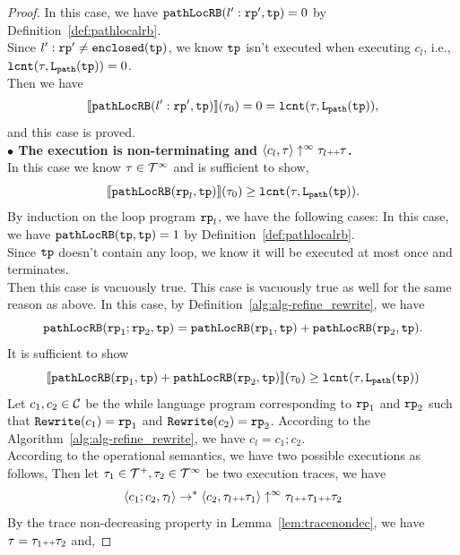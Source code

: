 \begin{proof}
  In this case, we have $\mathtt{pathLocRB}(l': \mathtt{rp}', \mathtt{tp}) = { 0} $ by Definition~\ref{def:pathlocalrb}.
  \\
  Since $l': \mathtt{rp}' \neq \mathtt{enclosed}(\mathtt{tp})$, we know $\mathtt{tp}$ isn't executed when executing $c_l$, i.e., $\mathtt{lcnt}(\mathtt{\tau}, \mathtt{L}_{\mathtt{path}}(\mathtt{tp})) = 0$.
  \\
  Then we have
  \[
    \llbracket \mathtt{pathLocRB}(l': \mathtt{rp}', \mathtt{tp}) \rrbracket(\mathtt{\tau}_0) = 0 = \mathtt{lcnt}(\mathtt{\tau}, \mathtt{L}_{\mathtt{path}}(\mathtt{tp})),
    \]
  and this case is proved.
\\
\textbf{$\bullet$ The execution is non-terminating and {$\langle {c_l}, \mathtt{\tau} \rangle \uparrow^{\infty} \mathtt{\tau}_l {\scriptscriptstyle ++} \mathtt{\tau}$}.} 
\\
 In this case we know $\mathtt{\tau} \in \mathcal{T}^{\infty}$ and is sufficient to show,
\[
  \llbracket \mathtt{pathLocRB}(\mathtt{rp}_l, \mathtt{tp}) \rrbracket(\mathtt{\tau}_0) \geq \mathtt{lcnt}(\mathtt{\tau}, \mathtt{L}_{\mathtt{path}}(\mathtt{tp})).
\]
By induction on the loop program $\mathtt{rp}_l$,
we have the following cases:
In this case, we have $\mathtt{pathLocRB}(\mathtt{tp}, \mathtt{tp}) = 1$ by Definition~\ref{def:pathlocalrb}. 
\\
Since $\mathtt{tp}$ doesn't contain any loop, we know it will be executed at most once and terminates.
\\
Then this case is vacuously true.
This case is vacuously true as well for the same reason as above.
In this case, by Definition~\ref{alg:alg-refine_rewrite}, we have 
$$\mathtt{pathLocRB}(\mathtt{rp}_1;\mathtt{rp}_2, \mathtt{tp}) = \mathtt{pathLocRB}(\mathtt{rp}_1, \mathtt{tp}) + \mathtt{pathLocRB}(\mathtt{rp}_2, \mathtt{tp}).$$
It is sufficient to show
\[
  \llbracket \mathtt{pathLocRB}(\mathtt{rp}_1, \mathtt{tp}) + \mathtt{pathLocRB}(\mathtt{rp}_2, \mathtt{tp}) \rrbracket(\mathtt{\tau}_0) \geq \mathtt{lcnt}(\mathtt{\tau}, \mathtt{L}_{\mathtt{path}}(\mathtt{tp})) 
\]
Let $c_1, c_2 \in \mathcal{C}$ be the while language program corresponding to $\mathtt{rp}_1$ and $\mathtt{rp}_2$ such that $\mathtt{Rewrite}(c_1) = \mathtt{rp}_1$ and $\mathtt{Rewrite}(c_2) = \mathtt{rp}_2$.
According to the Algorithm~\ref{alg:alg-refine_rewrite}, we have $c_l = c_1; c_2$.
\\
According to the operational semantics, we have two possible executions as follows,
Then let $\mathtt{\tau}_1 \in \mathcal{T}^{+}, \mathtt{\tau}_2 \in \mathcal{T}^{\infty}$ be two execution traces, we have
\[
  \langle c_1; c_2, \mathtt{\tau}_l \rangle \to^* \langle c_2, \mathtt{\tau}_l {\scriptscriptstyle ++} \mathtt{\tau}_1 \rangle \uparrow^{\infty} \mathtt{\tau}_l {\scriptscriptstyle ++} \mathtt{\tau}_1 {\scriptscriptstyle ++} \mathtt{\tau}_2
\]
By the trace non-decreasing property in Lemma~\ref{lem:tracenondec}, we have $\mathtt{\tau} = \mathtt{\tau}_1 {\scriptscriptstyle ++} \mathtt{\tau}_2$ and,

\end{proof}
